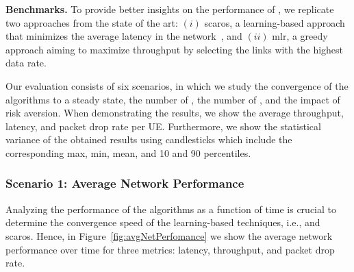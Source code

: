 \begin{table}[t]
\caption{Simulation parameters.}
\centering
{}\end{table}

\textbf{Benchmarks.} To provide better insights on the performance of \name{}, we replicate two approaches from the state of the art: $(i)$ \gls{scaros}, a learning-based approach that minimizes the average latency in the network~\cite{ortiz2019scaros}, and $(ii)$ \gls{mlr}, a greedy approach aiming to maximize throughput by selecting the links with the highest data rate.


Our evaluation consists of six scenarios, in which we study the convergence of the algorithms to a steady state, the number of \nodes{}, the number of \donors{}, and the impact of risk aversion. When demonstrating the results, we show the average throughput, latency, and packet drop rate per UE. Furthermore, we show the statistical variance of the obtained results using candlesticks which include the corresponding max, min, mean, and 10 and 90 percentiles. 

\subsubsection*{Scenario 1: Average Network Performance}
\label{sub:netPerformance}
Analyzing the performance of the algorithms as a function of time is crucial to determine the convergence speed of the learning-based techniques, i.e.,  \name{} and \gls{scaros}. Hence, in Figure~\ref{fig:avgNetPerfomance} we show the average network performance over time for three metrics: latency, throughput, and packet drop rate.

